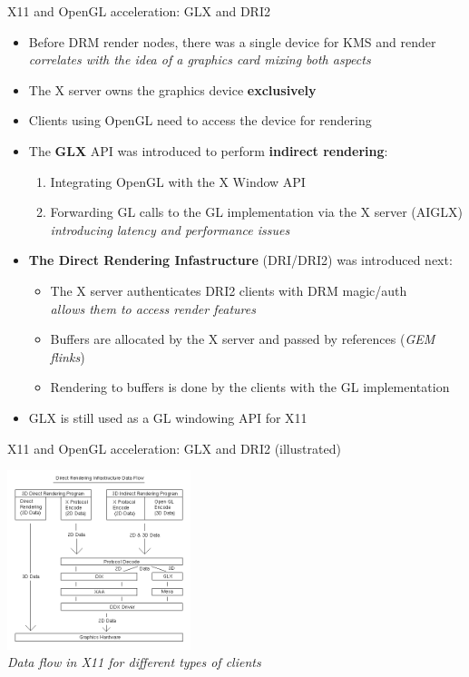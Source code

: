 \begin{frame}{X11 and OpenGL acceleration: GLX and DRI2}
  \begin{itemize}
  \item Before DRM render nodes, there was a single device for KMS and render\\
    \textit{correlates with the idea of a graphics card mixing both aspects}
  \item The X server owns the graphics device \textbf{exclusively}
  \item Clients using OpenGL need to access the device for rendering
  \item The \textbf{GLX} API was introduced to perform \textbf{indirect rendering}:
    \begin{enumerate}
    \item Integrating OpenGL with the X Window API
    \item Forwarding GL calls to the GL implementation via the X server (AIGLX)\\
      \textit{introducing latency and performance issues}
    \end{enumerate}
  \item \textbf{The Direct Rendering Infastructure} (DRI/DRI2) was introduced next:
    \begin{itemize}
    \item The X server authenticates DRI2 clients with DRM magic/auth\\
      \textit{allows them to access render features}
    \item Buffers are allocated by the X server and passed by references (\textit{GEM flinks})
    \item Rendering to buffers is done by the clients with the GL implementation
    \end{itemize}
  \item GLX is still used as a GL windowing API for X11
  \end{itemize}
\end{frame}

\begin{frame}{X11 and OpenGL acceleration: GLX and DRI2 (illustrated)}
  \begin{center}
  \includegraphics[width=0.4\textwidth]{slides/graphics-software/dri-data-flow.png}\\
  \textit{Data flow in X11 for different types of clients}
  \end{center}
\end{frame}

